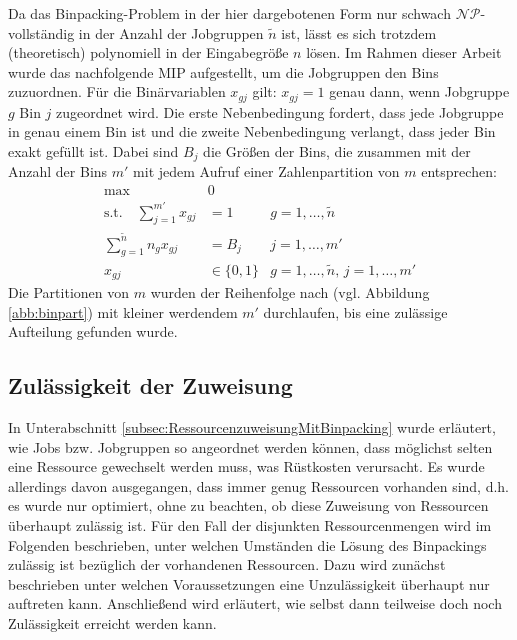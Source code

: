 \documentclass{scrreprt}
\begin{document}
Da das Binpacking-Problem in der hier dargebotenen Form nur schwach $\mathcal{NP}$-vollständig in der Anzahl der Jobgruppen $\tilde{n}$ ist,
lässt es sich trotzdem (theoretisch) polynomiell in der Eingabegröße $n$ lösen.
Im Rahmen dieser Arbeit wurde das nachfolgende MIP aufgestellt, um die Jobgruppen den Bins zuzuordnen.
Für die Binärvariablen $x_{gj}$ gilt: $x_{gj}=1$ genau dann, wenn Jobgruppe $g$ Bin $j$ zugeordnet wird.
Die erste Nebenbedingung fordert, dass jede Jobgruppe in genau einem Bin ist 
und die zweite Nebenbedingung verlangt, dass jeder Bin exakt gefüllt ist.
Dabei sind $B_j$ die Größen der Bins, die zusammen mit der Anzahl der Bins $m'$ mit jedem Aufruf einer Zahlenpartition von $m$ entsprechen:
\begin{align}
    \text{max} \quad &0 \\
    \text{s.t.}\quad \sum_{j=1}^{m'} x_{gj} &= 1 &g=1,\ldots,\tilde{n}\\
    \sum_{g=1}^{\tilde{n}} n_g x_{gj} &= B_j &j=1,\ldots,m' \\
    x_{gj} &\in \{0,1\} &g=1,\ldots,\tilde{n}, \, j=1,\ldots,m'
\end{align}
Die Partitionen von $m$ wurden der Reihenfolge nach (vgl. Abbildung \ref{abb:binpart}) mit kleiner werdendem $m'$ durchlaufen,
bis eine zulässige Aufteilung gefunden wurde.


\subsection{Zulässigkeit der Zuweisung}
\label{subsec:ZulaessigkeitDerZuweisung}
In Unterabschnitt \ref{subsec:RessourcenzuweisungMitBinpacking} wurde erläutert, wie Jobs bzw. Jobgruppen so angeordnet werden können,
dass möglichst selten eine Ressource gewechselt werden muss, was Rüstkosten verursacht.
Es wurde allerdings davon ausgegangen, dass immer genug Ressourcen vorhanden sind,
d.h. es wurde nur optimiert, ohne zu beachten, ob diese Zuweisung von Ressourcen überhaupt zulässig ist.
Für den Fall der disjunkten Ressourcenmengen wird im Folgenden beschrieben, unter welchen Umständen die Lösung des Binpackings zulässig ist
bezüglich der vorhandenen Ressourcen.
Dazu wird zunächst beschrieben unter welchen Voraussetzungen eine Unzulässigkeit überhaupt nur auftreten kann.
Anschließend wird erläutert, wie selbst dann teilweise doch noch Zulässigkeit erreicht werden kann.
\end{document}
